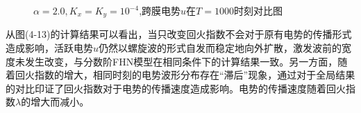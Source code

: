 \documentclass[twoside,UTF8]{nputhesis}
\begin{document}
\begin{figure}[h]
{\begin{minipage}{4cm}
		\end{minipage}
	}
	\setlength{\abovecaptionskip}{-0.2cm} %
	\caption{$\alpha = 2.0,K_{x} = K_{y} = {10}^{-4}$,跨膜电势$u$在$T=1000$时刻对比图}
	\label{fig:1a}
	\vspace{-0.5cm} %

\end{figure}

从图(4-13)的计算结果可以看出，当只改变回火指数不会对于原有电势的传播形式造成影响，活跃电势$u$仍然以螺旋波的形式自发而稳定地向外扩散，激发波前的宽度未发生改变，与分数阶FHN模型在相同条件下的计算结果一致。另一方面，随着回火指数的增大，相同时刻的电势波形分布存在“滞后”现象，通过对于全局结果的对比印证了回火指数对于电势的传播速度造成影响。电势的传播速度随着回火指数$\lambda$的增大而减小。
\end{document}
